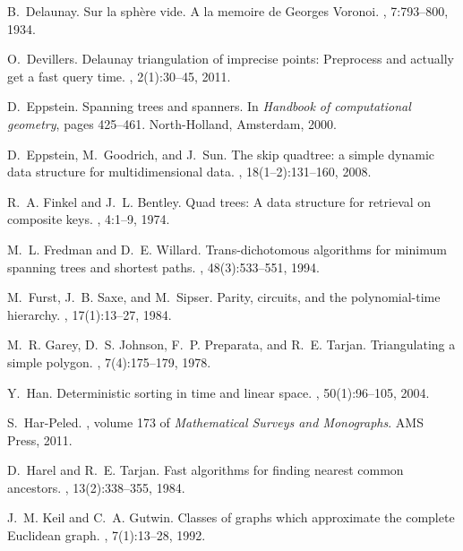 \documentclass[11pt]{paper}
\begin{document}
\begin{thebibliography}{10}
B.~Delaunay.
\newblock Sur la sph{\`e}re vide. {A} la memoire de {Georges} {Voronoi}.
, 7:793--800, 1934.

O.~Devillers.
\newblock Delaunay triangulation of imprecise points: Preprocess and actually
  get a fast query time.
, 2(1):30--45, 2011.

D.~Eppstein.
\newblock Spanning trees and spanners.
\newblock In {\em Handbook of computational geometry}, pages 425--461.
  North-Holland, Amsterdam, 2000.

D.~Eppstein, M.~Goodrich, and J.~Sun.
\newblock The skip quadtree: a simple dynamic data structure for
  multidimensional data.
, 18(1--2):131--160, 2008.

R.~A. Finkel and J.~L. Bentley.
\newblock Quad trees: A data structure for retrieval on composite keys.
, 4:1--9, 1974.

M.~L. Fredman and D.~E. Willard.
\newblock Trans-dichotomous algorithms for minimum spanning trees and shortest
  paths.
, 48(3):533--551, 1994.

M.~Furst, J.~B. Saxe, and M.~Sipser.
\newblock Parity, circuits, and the polynomial-time hierarchy.
, 17(1):13--27, 1984.

M.~R. Garey, D.~S. Johnson, F.~P. Preparata, and R.~E. Tarjan.
\newblock Triangulating a simple polygon.
, 7(4):175--179, 1978.

Y.~Han.
\newblock Deterministic sorting in {} time and linear space.
, 50(1):96--105, 2004.

S.~Har-Peled.
, volume 173 of {\em
  Mathematical Surveys and Monographs}.
\newblock AMS Press, 2011.

D.~Harel and R.~E. Tarjan.
\newblock Fast algorithms for finding nearest common ancestors.
, 13(2):338--355, 1984.

J.~M. Keil and C.~A. Gutwin.
\newblock Classes of graphs which approximate the complete {E}uclidean graph.
, 7(1):13--28, 1992.


\end{thebibliography}
\end{document}
